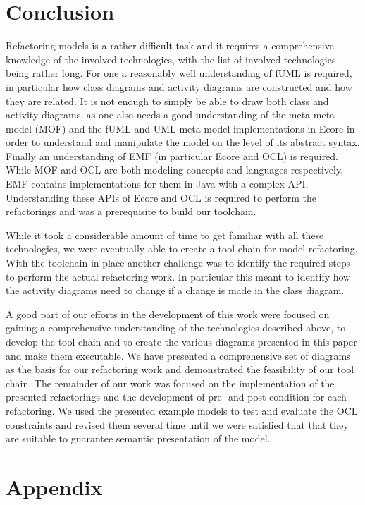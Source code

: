 \documentclass{llncs}
\begin{document}
\section{Conclusion}
\label{sec:conclusion}
Refactoring models is a rather difficult task and it requires a comprehensive knowledge of the involved technologies, with
the list of involved technologies being rather long. For one a reasonably well understanding of fUML is required, in
particular how class diagrams and activity diagrams are constructed and how they are related. It is not enough to simply
be able to draw both class and activity diagrams, as one also needs a good understanding of the meta-meta-model (MOF) and
the fUML and UML meta-model implementations in Ecore in order to understand and manipulate the model on the level of its 
abstract syntax. Finally an understanding of EMF (in particular Ecore and OCL) is required. While MOF and OCL are both 
modeling concepts and languages respectively, EMF contains implementations for them in Java with a complex API. 
Understanding these APIs of Ecore and OCL is required to perform the refactorings and was a prerequisite to build
our toolchain.

While it took a considerable amount of time to get familiar with all these technologies, we were eventually able to
create a tool chain for model refactoring. With the toolchain in place another challenge was to identify the required 
steps to perform the actual refactoring work. In particular this meant to identify how the activity diagrams need to 
change if a change is made in the class diagram.

A good part of our efforts in the development of this work were focused on gaining a comprehensive understanding of the
technologies described above, to develop the tool chain and to create the various diagrams presented in this paper and make 
them executable. We have presented a comprehensive set of diagrams as the basis for our refactoring work and demonstrated 
the feasibility of our tool chain. The remainder of our work was focused on the implementation of the presented refactorings and
the development of pre- and post condition for each refactoring. We used the presented example models to test and evaluate the
OCL constraints and revised them several time until we were satisfied that that they are suitable to guarantee semantic presentation
of the model.

\newpage



\newpage
\appendix
\section{Appendix}
\label{sec:appendix}
\end{document}
